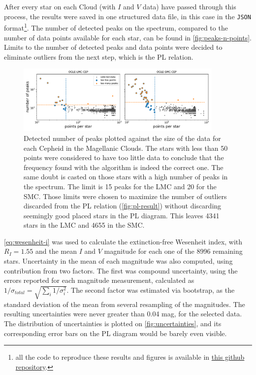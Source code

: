 After every star on each Cloud (with $I$ and $V$ data) have passed through this process, the results were saved in one structured data file, in this case in the \texttt{JSON} format\footnote{
	all the code to reproduce these results and figures is available in \href{https://github.com/JacobHilbert/another-spectrum/}{this github repository}.
}.
The number of detected peaks on the spectrum, compared to the number of data points available for each star, can be found in \autoref{fig:peaks-n-points}.
Limits to the number of detected peaks and data points were decided to eliminate outliers from the next step, which is the PL relation.

\begin{figure}
	\centering
	\includegraphics[width=0.9\textwidth]{img/peaks_vs_points.pdf}
	\caption[Detected number of peaks against data size]{
		Detected number of peaks plotted against the size of the data for each Cepheid in the Magellanic Clouds.
		The stars with less than 50 points were considered to have too little data to conclude that the frequency found with the algorithm is indeed the correct one.
		The same doubt is casted on those stars with a high number of peaks in the spectrum. The limit is 15 peaks for the LMC and 20 for the SMC.
		Those limits were chosen to maximize the number of outliers discarded from the PL relation (\autoref{fig:pl-result}) without discarding seemingly good placed stars in the PL diagram.
		This leaves 4341 stars in the LMC and 4655 in the SMC.
	}
	\label{fig:peaks-n-points}
\end{figure}


\autoref{eq:wesenheit-i} was used to calculate the extinction-free Wesenheit index, 
with $R_I=1.55$ \citep{OGLE2015,Ulaczyk2013} and the mean $I$ and $V$ magnitude for each one of the 8996 remaining stars.
Uncertainty in the mean of each magnitude was also computed, using contribution from two factors.
The first was compound uncertainty, using the errors reported for each magnitude measurement, calculated as $1/\sigma_{total}=\sqrt{\sum_i 1/\sigma_i^2}$.
The second factor was estimated via bootstrap, as the standard deviation of the mean from several resampling of the magnitudes.
The resulting uncertainties were never greater than 0.04 mag, for the selected data. 
The distribution of uncertainties is plotted on \autoref{fig:uncertainties}, 
and its corresponding error bars on the PL diagram would be barely even visible.


